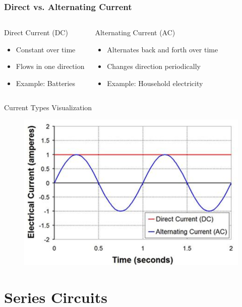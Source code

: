 \documentclass{beamer}
\begin{document}
\begin{frame}
\frametitle{Direct vs. Alternating Current}
\begin{columns}
\begin{block}{Direct Current (DC)}
\begin{itemize}
\item Constant over time
\item Flows in one direction
\item Example: Batteries
\end{itemize}
\end{block}

\begin{block}{Alternating Current (AC)}
\begin{itemize}
\item Alternates back and forth over time
\item Changes direction periodically
\item Example: Household electricity
\end{itemize}
\end{block}
\end{columns}

\begin{alertblock}{Current Types Visualization}
\begin{figure}
    \centering
    \includegraphics[width=0.5\linewidth]{phys11-circuits-ac-vs-dc-graph.png}
\end{figure}
\end{alertblock}
\end{frame}

\section{Series Circuits}
\end{document}
